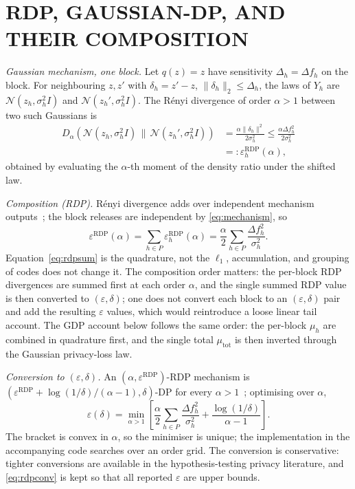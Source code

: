 \documentclass{ieeetj}
\providecommand{\RDP}{\mathrm{RDP}}
\theoremstyle{plain}
\theoremstyle{definition}
\begin{document}
\section{RDP, GAUSSIAN-DP, AND THEIR COMPOSITION}
\label{sec:rdpgdp}

\emph{Gaussian mechanism, one block.} Let $q(z)=z$ have sensitivity
$\Delta_h=\Delta f_h$ on the block. For neighbouring $z,z'$ with
$\delta_h=z'-z$, $\|\delta_h\|_2\le\Delta_h$, the laws of $Y_h$ are
$\mathcal{N}(z_h,\sigma_h^2I)$ and $\mathcal{N}(z_h',\sigma_h^2I)$. The
Rényi divergence of order $\alpha>1$ between two such Gaussians is
\begin{equation}
\begin{aligned}
D_\alpha\!\left(\mathcal{N}(z_h,\sigma_h^2I)\,\|\,
\mathcal{N}(z_h',\sigma_h^2 I)\right)
&=\frac{\alpha\|\delta_h\|^2}{2\sigma_h^2}
\le\frac{\alpha\Delta f_h^{2}}{2\sigma_h^{2}}\\
&=:\varepsilon_h^{\RDP}(\alpha),
\end{aligned}
\label{eq:rdpblock}
\end{equation}
obtained by evaluating the $\alpha$-th moment of the density ratio under the
shifted law.

\emph{Composition (RDP).} Rényi divergence adds over independent mechanism
outputs~\cite{mironov2017rdp}; the block releases are independent by
\eqref{eq:mechanism}, so
\begin{equation}
\varepsilon^{\RDP}(\alpha)=\sum_{h\in P}\varepsilon_h^{\RDP}(\alpha)
=\frac{\alpha}{2}\sum_{h\in P}\frac{\Delta f_h^{2}}{\sigma_h^{2}}.
\label{eq:rdpsum}
\end{equation}
Equation~\eqref{eq:rdpsum} is the quadrature, not the $\ell_1$, accumulation,
and grouping of codes does not change it. The composition order matters: the
per-block RDP divergences are summed first at each order $\alpha$, and the
single summed RDP value is then converted to $(\varepsilon,\delta)$; one does
not convert each block to an $(\varepsilon,\delta)$ pair and add the resulting
$\varepsilon$ values, which would reintroduce a loose linear tail account. The
GDP account below follows the same order: the per-block $\mu_h$ are combined in
quadrature first, and the single total $\mu_{\mathrm{tot}}$ is then inverted
through the Gaussian privacy-loss law.

\emph{Conversion to $(\varepsilon,\delta)$.} An
$(\alpha,\varepsilon^{\RDP})$-RDP mechanism is
$(\varepsilon^{\RDP}+\log(1/\delta)/(\alpha-1),\delta)$-DP for every
$\alpha>1$~\cite{mironov2017rdp}; optimising over $\alpha$,
\begin{equation}
\varepsilon(\delta)=\min_{\alpha>1}\left[
\frac{\alpha}{2}\sum_{h\in P}\frac{\Delta f_h^{2}}{\sigma_h^{2}}
+\frac{\log(1/\delta)}{\alpha-1}\right].
\label{eq:rdpconv}
\end{equation}
The bracket is convex in $\alpha$, so the minimiser is unique; the
implementation in the accompanying code searches over an order grid. The
conversion is conservative: tighter conversions are available in the
hypothesis-testing privacy literature, and \eqref{eq:rdpconv} is kept so that
all reported $\varepsilon$ are upper bounds.
\end{document}
